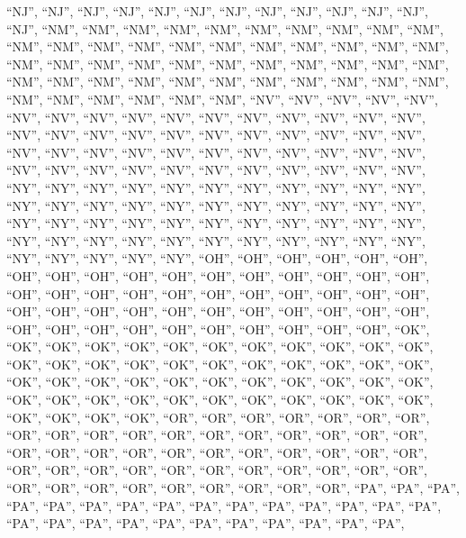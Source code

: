 \documentclass[
]{article}
\begin{document}
``NJ'', ``NJ'', ``NJ'', ``NJ'', ``NJ'', ``NJ'', ``NJ'', ``NJ'', ``NJ'',
``NJ'', ``NJ'', ``NJ'', ``NJ'', ``NM'', ``NM'', ``NM'', ``NM'', ``NM'',
``NM'', ``NM'', ``NM'', ``NM'', ``NM'', ``NM'', ``NM'', ``NM'', ``NM'',
``NM'', ``NM'', ``NM'', ``NM'', ``NM'', ``NM'', ``NM'', ``NM'', ``NM'',
``NM'', ``NM'', ``NM'', ``NM'', ``NM'', ``NM'', ``NM'', ``NM'', ``NM'',
``NM'', ``NM'', ``NM'', ``NM'', ``NM'', ``NM'', ``NM'', ``NM'', ``NM'',
``NM'', ``NM'', ``NM'', ``NM'', ``NM'', ``NM'', ``NM'', ``NM'', ``NV'',
``NV'', ``NV'', ``NV'', ``NV'', ``NV'', ``NV'', ``NV'', ``NV'', ``NV'',
``NV'', ``NV'', ``NV'', ``NV'', ``NV'', ``NV'', ``NV'', ``NV'', ``NV'',
``NV'', ``NV'', ``NV'', ``NV'', ``NV'', ``NV'', ``NV'', ``NV'', ``NV'',
``NV'', ``NV'', ``NV'', ``NV'', ``NV'', ``NV'', ``NV'', ``NV'', ``NV'',
``NV'', ``NV'', ``NV'', ``NV'', ``NV'', ``NV'', ``NV'', ``NV'', ``NV'',
``NV'', ``NV'', ``NV'', ``NY'', ``NY'', ``NY'', ``NY'', ``NY'', ``NY'',
``NY'', ``NY'', ``NY'', ``NY'', ``NY'', ``NY'', ``NY'', ``NY'', ``NY'',
``NY'', ``NY'', ``NY'', ``NY'', ``NY'', ``NY'', ``NY'', ``NY'', ``NY'',
``NY'', ``NY'', ``NY'', ``NY'', ``NY'', ``NY'', ``NY'', ``NY'', ``NY'',
``NY'', ``NY'', ``NY'', ``NY'', ``NY'', ``NY'', ``NY'', ``NY'', ``NY'',
``NY'', ``NY'', ``NY'', ``NY'', ``NY'', ``NY'', ``NY'', ``OH'', ``OH'',
``OH'', ``OH'', ``OH'', ``OH'', ``OH'', ``OH'', ``OH'', ``OH'', ``OH'',
``OH'', ``OH'', ``OH'', ``OH'', ``OH'', ``OH'', ``OH'', ``OH'', ``OH'',
``OH'', ``OH'', ``OH'', ``OH'', ``OH'', ``OH'', ``OH'', ``OH'', ``OH'',
``OH'', ``OH'', ``OH'', ``OH'', ``OH'', ``OH'', ``OH'', ``OH'', ``OH'',
``OH'', ``OH'', ``OH'', ``OH'', ``OH'', ``OH'', ``OH'', ``OH'', ``OH'',
``OH'', ``OH'', ``OK'', ``OK'', ``OK'', ``OK'', ``OK'', ``OK'', ``OK'',
``OK'', ``OK'', ``OK'', ``OK'', ``OK'', ``OK'', ``OK'', ``OK'', ``OK'',
``OK'', ``OK'', ``OK'', ``OK'', ``OK'', ``OK'', ``OK'', ``OK'', ``OK'',
``OK'', ``OK'', ``OK'', ``OK'', ``OK'', ``OK'', ``OK'', ``OK'', ``OK'',
``OK'', ``OK'', ``OK'', ``OK'', ``OK'', ``OK'', ``OK'', ``OK'', ``OK'',
``OK'', ``OK'', ``OK'', ``OK'', ``OK'', ``OK'', ``OR'', ``OR'', ``OR'',
``OR'', ``OR'', ``OR'', ``OR'', ``OR'', ``OR'', ``OR'', ``OR'', ``OR'',
``OR'', ``OR'', ``OR'', ``OR'', ``OR'', ``OR'', ``OR'', ``OR'', ``OR'',
``OR'', ``OR'', ``OR'', ``OR'', ``OR'', ``OR'', ``OR'', ``OR'', ``OR'',
``OR'', ``OR'', ``OR'', ``OR'', ``OR'', ``OR'', ``OR'', ``OR'', ``OR'',
``OR'', ``OR'', ``OR'', ``OR'', ``OR'', ``OR'', ``OR'', ``OR'', ``OR'',
``OR'', ``PA'', ``PA'', ``PA'', ``PA'', ``PA'', ``PA'', ``PA'', ``PA'',
``PA'', ``PA'', ``PA'', ``PA'', ``PA'', ``PA'', ``PA'', ``PA'', ``PA'',
``PA'', ``PA'', ``PA'', ``PA'', ``PA'', ``PA'', ``PA'', ``PA'', ``PA'',
\end{document}
